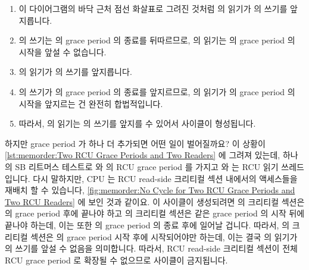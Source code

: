 \begin{enumerate}
\item	이 다이어그램의 바닥 근처 점선 화살표로 그려진 것처럼  의
	 읽기가  의 쓰기를 앞지릅니다.
\item	{} 의 쓰기는  의 grace period 의 종료를 뒤따르므로,
	 의  읽기는  의 grace period 의 시작을 앞설 수
	없습니다.
\item	{} 의  읽기가  의 쓰기를 앞지릅니다.
\item	{} 의  쓰기가  의 grace period 의 종료를
	앞지르므로,  의  읽기가  의 grace period 의
	시작을 앞지르는 건 완전히 합법적입니다.
\item	따라서,  의  읽기는  의 쓰기를 앞지를 수
	있어서 사이클이 형성됩니다.

\end{enumerate}

하지만 grace period 가 하나 더 추가되면 어떤 일이 벌어질까요?
이 상황이
\cref{lst:memorder:Two RCU Grace Periods and Two Readers} 에 그려져 있는데,
하나의 SB 리트머스 테스트로  와  의 RCU grace period 를
가지고  와  는 RCU 읽기 쓰레드입니다.
다시 말하지만, CPU 는 RCU read-side 크리티컬 섹션 내에서의 액세스들을 재배치 할
수 있습니다,
\cref{fig:memorder:No Cycle for Two RCU Grace Periods and Two RCU Readers} 에
보인 것과 같이요.
이 사이클이 생성되려면  의 크리티컬 섹션은  의 grace period
후에 끝나야 하고  의 크리티컬 섹션은 같은 grace period 의 시작 뒤에
끝나야 하는데, 이는 또한  의 grace period 의 종료 후에 일어날 겁니다.
따라서,  의 크리티컬 섹션은  의 grace period 시작 후에
시작되어야만 하는데, 이는 결국  의  읽기가  의 쓰기를
앞설 수 없음을 의미합니다.
따라서, RCU read-side 크리티컬 섹션이 전체 RCU grace period 로 확장될 수
없으므로 사이클이 금지됩니다.


